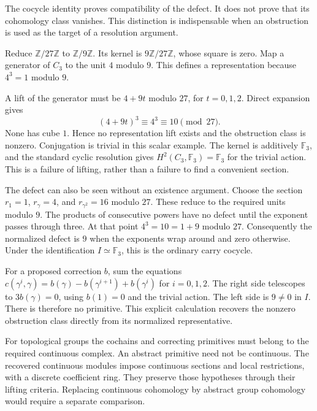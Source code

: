 The cocycle identity proves compatibility of the defect. It does not prove
that its cohomology class vanishes. This distinction is indispensable when
an obstruction is used as the target of a resolution argument.

\begin{example}
Reduce $\mathbb Z/27\mathbb Z$ to $\mathbb Z/9\mathbb Z$. Its kernel is
$9\mathbb Z/27\mathbb Z$, whose square is zero. Map a generator of $C_3$
to the unit $4$ modulo $9$. This defines a representation because
$4^3=1$ modulo $9$.

A lift of the generator must be $4+9t$ modulo $27$, for $t=0,1,2$.
Direct expansion gives
\[
 (4+9t)^3\equiv 4^3\equiv 10\pmod {27}.
\]
None has cube $1$. Hence no representation lift exists and the obstruction
class is nonzero. Conjugation is trivial in this scalar example. The
kernel is additively $\mathbb F_3$, and the standard cyclic resolution gives
$H^2(C_3,\mathbb F_3)=\mathbb F_3$ for the trivial action. This is a
failure of lifting, rather than a failure to find a convenient section.

The defect can also be seen without an existence argument. Choose the
section $r_1=1$, $r_\gamma=4$, and $r_{\gamma^2}=16$ modulo $27$. These
reduce to the required units modulo $9$. The products of consecutive
powers have no defect until the exponent passes through three. At that
point $4^3=10=1+9$ modulo $27$. Consequently the normalized defect is
$9$ when the exponents wrap around and zero otherwise. Under the
identification $I\simeq\mathbb F_3$, this is the ordinary carry cocycle.

For a proposed correction $b$, sum the equations
$c(\gamma^i,\gamma)=b(\gamma)-b(\gamma^{i+1})+b(\gamma^i)$ for
$i=0,1,2$. The right side telescopes to $3b(\gamma)=0$, using
$b(1)=0$ and the trivial action. The left side is $9\ne0$ in $I$.
There is therefore no primitive. This explicit calculation recovers the
nonzero obstruction class directly from its normalized representative.
\end{example}

For topological groups the cochains and correcting primitives must belong
to the required continuous complex. An abstract primitive need not be
continuous. The recovered continuous modules impose continuous sections and
local restrictions, with a discrete coefficient ring. They preserve those
hypotheses through their lifting criteria. Replacing continuous cohomology
by abstract group cohomology would require a separate comparison.

